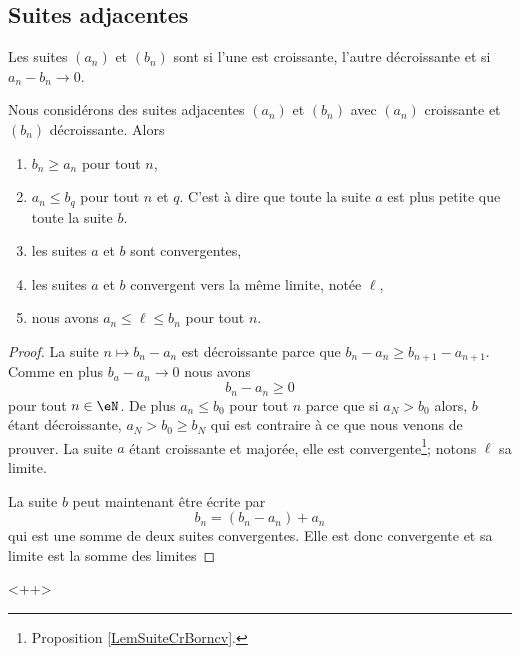\subsection{Suites adjacentes}

\begin{definition}       \label{DEFooDMZLooDtNPmu}
    Les suites \( (a_n)\) et \( (b_n)\) sont  si l'une est croissante, l'autre décroissante et si \( a_n-b_n\to 0\).
\end{definition}

\begin{theorem}
    Nous considérons des suites adjacentes \( (a_n)\) et \( (b_n)\) avec \( (a_n)\) croissante et \( (b_n)\) décroissante. Alors
    \begin{enumerate}
        \item
            \( b_n\geq a_n\) pour tout \( n\),
        \item
            \( a_n\leq b_q\) pour tout \( n\) et \( q\). C'est à dire que toute la suite \( a\) est plus petite que toute la suite \( b\).
        \item
            les suites \( a\) et \( b\) sont convergentes,
        \item
            les suites \( a\) et \( b\) convergent vers la même limite, notée \( \ell\),
        \item
            nous avons \( a_n\leq \ell\leq b_n\) pour tout \( n\).
    \end{enumerate}
\end{theorem}

\begin{proof}
    La suite \( n\mapsto b_n-a_n\) est décroissante parce que \( b_n-a_n\geq b_{n+1}-a_{n+1}\). Comme en plus \( b_a-a_n\to 0\) nous avons
    \begin{equation}
        b_n-a_n\geq 0
    \end{equation}
    pour tout \( n\in \eN\). De plus \( a_n\leq b_0\) pour tout \( n\) parce que si \( a_N>b_0\) alors, \( b\) étant décroissante, \( a_N>b_0\geq b_N\) qui est contraire à ce que nous venons de prouver. La suite \( a\) étant croissante et majorée, elle est convergente\footnote{Proposition \ref{LemSuiteCrBorncv}.}; notons \( \ell\) sa limite.

    La suite \( b\) peut maintenant être écrite par
    \begin{equation}
        b_n=(b_n-a_n)+a_n
    \end{equation}
    qui est une somme de deux suites convergentes. Elle est donc convergente et sa limite est la somme des limites
\end{proof}
<++>

